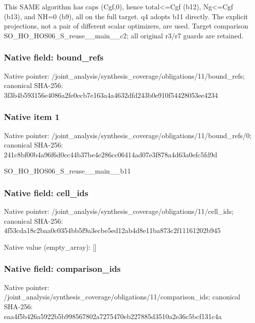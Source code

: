 \documentclass[10pt,a4paper]{article}
\begin{document}
\begingroup\raggedright\sloppy This SAME algorithm has caps (Cgf,\allowbreak{}0),\allowbreak{} hence total<=\allowbreak{}Cgf (b12),\allowbreak{} Ng<=\allowbreak{}Cgf (b13),\allowbreak{} and NH=\allowbreak{}0 (b9),\allowbreak{} all on the full target. q4 adopts b11 directly. The explicit projections,\allowbreak{} not a pair of different scalar optimizers,\allowbreak{} are used. Target comparison SO\_\allowbreak{}HO\_\allowbreak{}HOS06\_\allowbreak{}S\_\allowbreak{}reuse\_\allowbreak{}\_\allowbreak{}main\_\allowbreak{}\_\allowbreak{}c2;\allowbreak{} all original r3/\allowbreak{}r7 guards are retained.\par\endgroup

\subsubsection{Native field: bound\_\allowbreak{}refs}
Native pointer: /joint\_\allowbreak{}analysis/synthesis\_\allowbreak{}coverage/obligations/11/bound\_\allowbreak{}refs; canonical SHA-256: 3f3b4b593156e4086a2fe0ecb7e163a4a4632dfd243b0e910f54428053ee4234

\subsubsection{Native item 1}
Native pointer: /joint\_\allowbreak{}analysis/synthesis\_\allowbreak{}coverage/obligations/11/bound\_\allowbreak{}refs/0; canonical SHA-256: 241c8bf00b4a96f6d0cc44b37be4e286cc06414ad07e3f878a4d63a0efc5fd9d

\begingroup\raggedright\sloppy SO\_\allowbreak{}HO\_\allowbreak{}HOS06\_\allowbreak{}S\_\allowbreak{}reuse\_\allowbreak{}\_\allowbreak{}main\_\allowbreak{}\_\allowbreak{}b11\par\endgroup

\subsubsection{Native field: cell\_\allowbreak{}ids}
Native pointer: /joint\_\allowbreak{}analysis/synthesis\_\allowbreak{}coverage/obligations/11/cell\_\allowbreak{}ids; canonical SHA-256: 4f53cda18c2baa0c0354bb5f9a3ecbe5ed12ab4d8e11ba873c2f11161202b945

Native value (empty\_\allowbreak{}array): []

\subsubsection{Native field: comparison\_\allowbreak{}ids}
Native pointer: /joint\_\allowbreak{}analysis/synthesis\_\allowbreak{}coverage/obligations/11/comparison\_\allowbreak{}ids; canonical SHA-256: eaa4f5b426a5922b5b998567802a7275470eb227885d3510a2e36c5bcf131c4a
\end{document}

